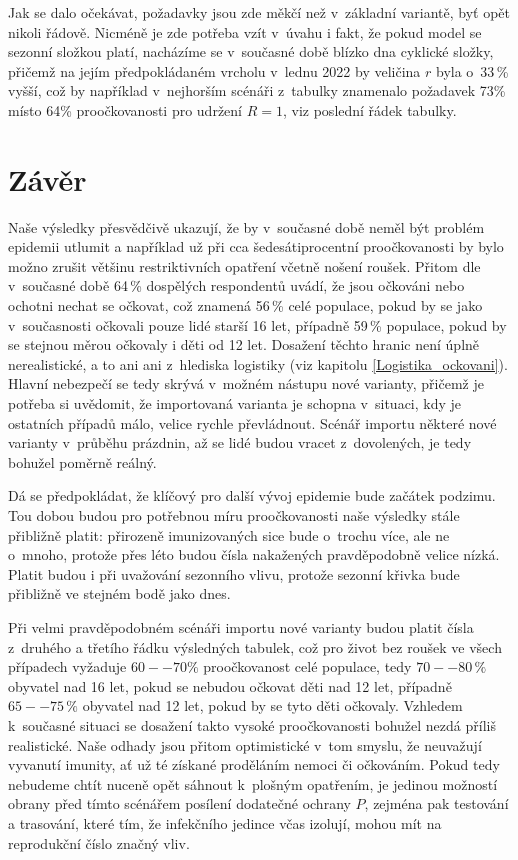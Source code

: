 Jak se dalo očekávat, požadavky jsou zde měkčí než v~základní variantě,
byť opět nikoli řádově. Nicméně je zde potřeba vzít v~úvahu i fakt, že  pokud model se sezonní složkou platí, nacházíme se v~současné době blízko dna cyklické složky, přičemž na jejím předpokládaném
vrcholu v~lednu 2022 by veličina $r$ byla o~33\,\% vyšší, což by například
v~nejhorším scénáři z~tabulky znamenalo požadavek 73\% místo 64\% proočkovanosti
pro udržení $R=1$, viz poslední řádek tabulky.

\section*{Závěr}

Naše výsledky přesvědčivě ukazují, že by v~současné době neměl být problém epidemii
utlumit a například už při cca šedesátiprocentní proočkovanosti
by bylo možno zrušit většinu restriktivních opatření včetně nošení roušek. Přitom dle \cite{paqcovid} v~současné době 64\,\% dospělých respondentů uvádí, že jsou očkováni nebo ochotni nechat se očkovat, což znamená 56\,\% celé populace, pokud by se jako v~současnosti očkovali pouze lidé starší 16 let, případně 59\,\% populace, pokud by se stejnou měrou očkovaly i děti od 12 let. Dosažení těchto hranic není úplně nerealistické, a to ani
ani z~hlediska logistiky (viz kapitolu \ref{Logistika_ockovani}). Hlavní nebezpečí se tedy
skrývá v~možném nástupu nové varianty, přičemž je potřeba si uvědomit,
že importovaná varianta je schopna v~situaci, kdy je ostatních
případů málo, velice rychle převládnout. Scénář importu některé
nové varianty v~průběhu prázdnin, až se lidé budou vracet z~dovolených, je
tedy bohužel poměrně reálný.

Dá se předpokládat, že klíčový pro další vývoj epidemie bude začátek podzimu. Tou dobou budou pro potřebnou míru proočkovanosti naše výsledky stále přibližně platit: přirozeně imunizovaných sice bude o~trochu více, ale ne o~mnoho, protože přes léto budou čísla nakažených pravděpodobně velice nízká. Platit budou i při uvažování sezonního vlivu, protože sezonní křivka bude přibližně ve stejném bodě jako dnes. 

Při velmi pravděpodobném scénáři importu nové varianty budou platit čísla z~druhého a třetího řádku výsledných tabulek, což pro život bez roušek ve všech případech vyžaduje $60--70\%$ proočkovanost celé populace, tedy $70--80\,\%$ obyvatel nad 16 let, pokud se nebudou očkovat děti nad 12 let, případně $65--75\,\%$ obyvatel nad 12 let, pokud by se tyto děti očkovaly. Vzhledem k~současné situaci se dosažení takto vysoké proočkovanosti bohužel nezdá příliš realistické. Naše odhady jsou přitom optimistické v~tom smyslu, že neuvažují vyvanutí imunity, ať už té získané proděláním nemoci či očkováním.
Pokud tedy nebudeme chtít nuceně opět sáhnout k~plošným
opatřením, je jedinou možností obrany před tímto scénářem posílení
dodatečné ochrany $P$, zejména pak testování a trasování, které tím, že
infekčního jedince včas izolují, mohou mít na reprodukční číslo značný
vliv.